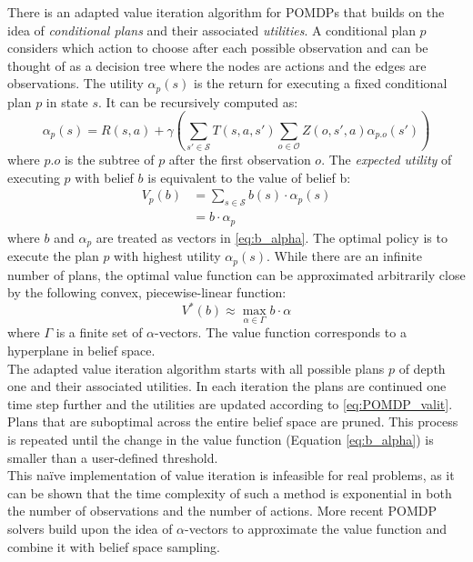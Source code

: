 There is an adapted value iteration algorithm for POMDPs that builds on the idea of \textit{conditional plans} and their associated \textit{utilities}. A conditional plan $p$ considers which action to choose after each possible observation and can be thought of as a decision tree where the nodes are actions and the edges are observations.
The utility $\alpha_p(s)$ is the return for executing a fixed conditional plan $p$ in state $s$. It can be recursively computed as:
\begin{equation}\label{eq:POMDP_valit}
    \alpha_p(s) = R(s,a) + \gamma\left(\sum_{s'\in\mathcal{S}}T(s,a,s')\sum_{o\in\mathcal{O}}Z(o, s', a)\alpha_{p.o}(s')\right)
\end{equation}
where $p.o$ is the subtree of $p$ after the first observation $o$. The \textit{expected utility} of executing $p$ with belief $b$ is equivalent to the value of belief b:
\begin{align}
        V_p(b) &= \sum_{s\in\mathcal{S}}b(s)\cdot \alpha_p(s)\\
        &=\label{eq:b_alpha} b\cdot \alpha_p
\end{align}
where $b$ and $\alpha_p$ are treated as vectors in \ref{eq:b_alpha}. The optimal policy is to execute the plan $p$ with highest utility $\alpha_p(s)$. While there are an infinite number of plans, the optimal value function can be approximated arbitrarily close by the following convex, piecewise-linear function:
%
\begin{equation}\label{eq:Vstarbalpha}
    V^*(b) \approx \max_{\alpha\in\Gamma} b\cdot \alpha
\end{equation}
%
where $\Gamma$ is a finite set of $\alpha$-vectors. The value function corresponds to a hyperplane in belief space.\\

The adapted value iteration algorithm starts with all possible plans $p$ of depth one and their associated utilities. In each iteration the plans are continued one time step further and the utilities are updated according to \ref{eq:POMDP_valit}. Plans that are suboptimal across the entire belief space are pruned. This process is repeated until the change in the value function (Equation \ref{eq:b_alpha}) is smaller than a user-defined threshold.\\

This na\"ive implementation of value iteration is infeasible for real problems, as it can be shown that the time complexity of such a method is exponential in both the number of observations and the number of actions. More recent POMDP solvers build upon the idea of $\alpha$-vectors to approximate the value function and combine it with belief space sampling.
